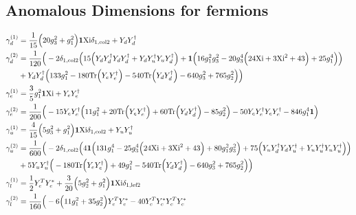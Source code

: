 \subsection{Anomalous Dimensions for fermions}
{\allowdisplaybreaks \begin{align} 
\gamma_{d}^{(1)} & =  
\frac{1}{15} \Big(20 g_{3}^{2}  + g_{1}^{2}\Big){\bf 1} \text{Xi} \delta_{1,\text{col2}}  + {Y_d  Y_{d}^{\dagger}}\\ 
\gamma_{d}^{(2)} & =  
\frac{1}{120} \Big(-2 \delta_{1,\text{col2}} \Big(15 \Big({Y_d  Y_{d}^{\dagger}  Y_d  Y_{d}^{\dagger}} + {Y_d  Y_{u}^{\dagger}  Y_u  Y_{d}^{\dagger}}\Big) + {\bf 1} \Big(16 g_{1}^{2} g_{3}^{2}  -20 g_{3}^{4} \Big(24 \text{Xi}  + 3 \text{Xi}^{2}  + 43\Big) + 25 g_{1}^{4} \Big)\Big)\nonumber \\ 
 &+{Y_d  Y_{d}^{\dagger}} \Big(133 g_{1}^{2}  -180 \mbox{Tr}\Big({Y_e  Y_{e}^{\dagger}}\Big)  -540 \mbox{Tr}\Big({Y_d  Y_{d}^{\dagger}}\Big)  -640 g_{3}^{2}  + 765 g_{2}^{2} \Big)\Big)\\ 
\gamma_{e}^{(1)} & =  
\frac{3}{5} g_{1}^{2} {\bf 1} \text{Xi}  + {Y_e  Y_{e}^{\dagger}}\\ 
\gamma_{e}^{(2)} & =  
\frac{1}{200} \Big(-15 {Y_e  Y_{e}^{\dagger}} \Big(11 g_{1}^{2}  + 20 \mbox{Tr}\Big({Y_e  Y_{e}^{\dagger}}\Big)  + 60 \mbox{Tr}\Big({Y_d  Y_{d}^{\dagger}}\Big)  -85 g_{2}^{2} \Big) -50 {Y_e  Y_{e}^{\dagger}  Y_e  Y_{e}^{\dagger}}  -846 g_{1}^{4} {\bf 1} \Big)\\ 
\gamma_{u}^{(1)} & =  
\frac{4}{15} \Big(5 g_{3}^{2}  + g_{1}^{2}\Big){\bf 1} \text{Xi} \delta_{1,\text{col2}}  + {Y_u  Y_{u}^{\dagger}}\\ 
\gamma_{u}^{(2)} & =  
\frac{1}{600} \Big(-2 \delta_{1,\text{col2}} \Big(4 {\bf 1} \Big(131 g_{1}^{4}  -25 g_{3}^{4} \Big(24 \text{Xi}  + 3 \text{Xi}^{2}  + 43\Big) + 80 g_{1}^{2} g_{3}^{2} \Big) + 75 \Big({Y_u  Y_{d}^{\dagger}  Y_d  Y_{u}^{\dagger}} + {Y_u  Y_{u}^{\dagger}  Y_u  Y_{u}^{\dagger}}\Big)\Big)\nonumber \\ 
 &+5 {Y_u  Y_{u}^{\dagger}} \Big(-180 \mbox{Tr}\Big({Y_e  Y_{e}^{\dagger}}\Big)  + 49 g_{1}^{2}  -540 \mbox{Tr}\Big({Y_d  Y_{d}^{\dagger}}\Big)  -640 g_{3}^{2}  + 765 g_{2}^{2} \Big)\Big)\\ 
\gamma_{l}^{(1)} & =  
\frac{1}{2} {Y_{e}^{T}  Y_e^*}  + \frac{3}{20} \Big(5 g_{2}^{2}  + g_{1}^{2}\Big){\bf 1} \text{Xi} \delta_{1,\text{lef2}} \\ 
\gamma_{l}^{(2)} & =  
\frac{1}{160} \Big(-6 \Big(11 g_{1}^{2}  + 35 g_{2}^{2} \Big){Y_{e}^{T}  Y_e^*} -40 {Y_{e}^{T}  Y_e^*  Y_{e}^{T}  Y_e^*} \nonumber \\ 

\end{align}}
